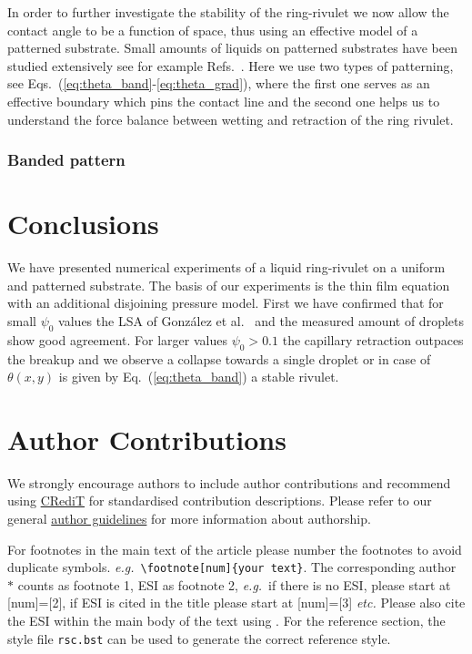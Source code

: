 \documentclass[twoside,twocolumn,9pt]{article}
\begin{document}
In order to further investigate the stability of the ring-rivulet we now allow the contact angle to be a function of space, thus using an effective model of a patterned substrate. 
Small amounts of liquids on patterned substrates have been studied extensively see for example Refs.~\cite{savvaDropletMotionInclined2013, vellingiriDropletSpreadingChemically2011, wangWettingEffectPatterned2023, wuInvestigationEquilibriumDroplet2019}.
Here we use two types of patterning, see Eqs.~(\ref{eq:theta_band}-\ref{eq:theta_grad}), where the first one serves as an effective boundary which pins the contact line and the second one helps us to understand the force balance between wetting and retraction of the ring rivulet.

\subsubsection{Banded pattern}\label{subsubsec:banded}



\section{Conclusions}\label{sec:conclu}
We have presented numerical experiments of a liquid ring-rivulet on a uniform and patterned substrate. 
The basis of our experiments is the thin film equation with an additional disjoining pressure model.
First we have confirmed that for small $\psi_0$ values the LSA of Gonz{\'a}lez et al.~\cite{gonzalezStabilityLiquidRing2013} and the measured amount of droplets show good agreement.
For larger values $\psi_0 > 0.1$ the capillary retraction outpaces the breakup and we observe a collapse towards a single droplet or in case of $\theta(x,y)$ is given by Eq.~(\ref{eq:theta_band}) a stable rivulet.



\section*{Author Contributions}
We strongly encourage authors to include author contributions and recommend using \href{https://casrai.org/credit/}{CRediT} for standardised contribution descriptions. Please refer to our general \href{https://www.rsc.org/journals-books-databases/journal-authors-reviewers/author-responsibilities/}{author guidelines} for more information about authorship.

For footnotes in the main text of the article please number the footnotes to avoid duplicate symbols. \textit{e.g.}\ \texttt{\textbackslash footnote[num]\{your text\}}. The corresponding author $\ast$ counts as footnote 1, ESI as footnote 2, \textit{e.g.}\ if there is no ESI, please start at [num]=[2], if ESI is cited in the title please start at [num]=[3] \textit{etc.} Please also cite the ESI within the main body of the text using \dag. For the reference section, the style file \texttt{rsc.bst} can be used to generate the correct reference style.
\end{document}
